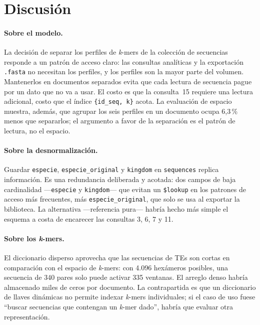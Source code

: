 \documentclass[journal]{IEEEtran}
\begin{document}
\section{Discusión}
\paragraph*{Sobre el modelo.}
La decisión de separar los perfiles de \textit{k}-mers de la colección de secuencias
responde a un patrón de acceso claro: las consultas analíticas y la exportación
\texttt{.fasta} no necesitan los perfiles, y los perfiles son la mayor parte del volumen.
Mantenerlos en documentos separados evita que cada lectura de secuencia pague por un dato
que no va a usar. El costo es que la consulta~15 requiere una lectura adicional, costo que
el índice \texttt{\{id\_seq, k\}} acota. La evaluación de espacio muestra, además, que
agrupar los seis perfiles en un documento ocupa 6,3\,\% menos que separarlos; el argumento
a favor de la separación es el patrón de lectura, no el espacio.

\paragraph*{Sobre la desnormalización.}
Guardar \texttt{especie}, \texttt{especie\_original} y \texttt{kingdom} en \texttt{sequences}
replica información. Es una redundancia deliberada y acotada: dos campos de baja cardinalidad
---\texttt{especie} y \texttt{kingdom}--- que evitan un \texttt{\$lookup} en los patrones de
acceso más frecuentes, más \texttt{especie\_original}, que solo se usa al exportar la
biblioteca. La alternativa ---referencia pura--- habría hecho más simple el esquema a costa
de encarecer las consultas 3, 6, 7 y 11.

\paragraph*{Sobre los \textit{k}-mers.}
El diccionario disperso aprovecha que las secuencias de TEs son cortas en comparación con el
espacio de \textit{k}-mers: con 4.096 hexámeros posibles, una secuencia de 340 pares solo
puede activar 335 ventanas. El arreglo denso habría almacenado miles de ceros por documento.
La contrapartida es que un diccionario de llaves dinámicas no permite indexar \textit{k}-mers
individuales; si el caso de uso fuese ``buscar secuencias que contengan un \textit{k}-mer
dado'', habría que evaluar otra representación.
\end{document}
